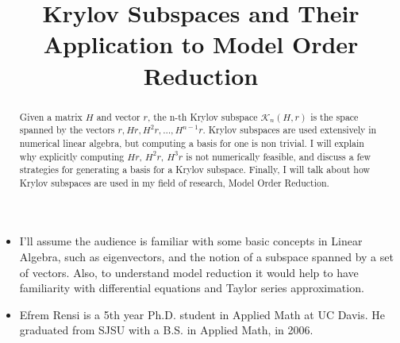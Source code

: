 \documentclass[]{article}
\title{Krylov Subspaces and Their Application to Model Order Reduction}
\newcommand{\krylov}[3]{\mathcal{K}_{#1}({#2},{#3})}
\begin{document}
\maketitle
\begin{abstract}
Given a matrix $H$ and vector $r$, the n-th Krylov subspace $\krylov{n}{H}{r}$ is the space spanned 
by the vectors $r, Hr,  H^2r, \ldots, H^{n-1}r$.   Krylov subspaces are used extensively in numerical 
linear algebra, but computing a basis for one is non trivial.  I will explain why explicitly computing 
$Hr$, $H^2r$, $H^3r$ is not numerically feasible, and discuss a few strategies for 
generating a basis for a Krylov subspace.  Finally, I will talk about how Krylov subspaces are used in 
my field of research, Model Order Reduction.
\end{abstract}

\begin{itemize}
\item I'll assume the audience is familiar with some basic concepts in Linear Algebra, such as eigenvectors, and the notion of a subspace spanned by a set of vectors.  Also, to understand model reduction it would help to have familiarity with differential equations and Taylor series approximation.

\item Efrem Rensi is a 5th year Ph.D. student in Applied Math at UC Davis. He graduated from SJSU with a B.S. in Applied Math, in 2006.

\end{itemize}
\end{document}
